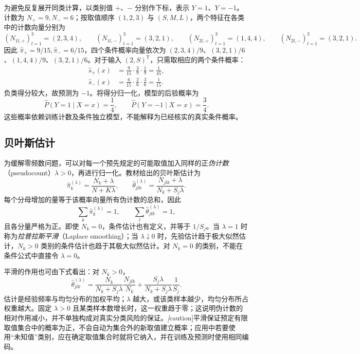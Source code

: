 \begin{solve}
为避免反复展开同类计算，以类别值 $+$、$-$ 分别作下标，表示 $Y=1$、$Y=-1$。计数为 $N_+=9,N_-=6$；按取值顺序 $(1,2,3)$ 与 $(S,M,L)$，两个特征在各类中的计数向量分别为
\[
    (N_{1l,+})_{l=1}^{3}=(2,3,4),\qquad
    (N_{1l,-})_{l=1}^{3}=(3,2,1),\qquad
    (N_{2l,+})_{l=1}^{3}=(1,4,4),\qquad
    (N_{2l,-})_{l=1}^{3}=(3,2,1).
\]
因此 $\widehat\pi_+=9/15,\widehat\pi_-=6/15$，四个条件概率向量依次为 $(2,3,4)/9$、$(3,2,1)/6$、$(1,4,4)/9$、$(3,2,1)/6$。对于输入 $(2,S)^{\mathsf T}$，只需取相应的两个条件概率：
\begin{align*}
    \widehat s_+(x)&=\frac{9}{15}\cdot\frac{3}{9}\cdot\frac{1}{9}=\frac{1}{45},\\
    \widehat s_-(x)&=\frac{6}{15}\cdot\frac{2}{6}\cdot\frac{3}{6}=\frac{1}{15}.
\end{align*}
负类得分较大，故预测为 $-1$。将得分归一化，模型的后验概率为
\[
    \widehat P(Y=1\mid X=x)=\frac14,\qquad
    \widehat P(Y=-1\mid X=x)=\frac34.
\]
这些概率依赖训练计数及条件独立模型，不能解释为已经核实的真实条件概率。
\end{solve}

\subsection{贝叶斯估计}
\label{subsec:lihang-nb-bayesian-estimation}

为缓解零频数问题，可以对每一个预先规定的可能取值加入同样的正\emph{伪计数}（pseudocount）$\lambda>0$，再进行归一化。教材给出的贝叶斯估计为
\begin{equation}
\label{eq:lihang-nb-smoothed-probabilities}
    \widehat\pi_k^{(\lambda)}=\frac{N_k+\lambda}{N+K\lambda},\qquad
    \widehat\theta_{jlk}^{(\lambda)}=\frac{N_{jlk}+\lambda}{N_k+S_j\lambda}.
\end{equation}
每个分母增加的量等于该概率向量所有伪计数的总和，因此
\[
    \sum_k\widehat\pi_k^{(\lambda)}=1,\qquad
    \sum_l\widehat\theta_{jlk}^{(\lambda)}=1,
\]
且各分量严格为正。即使 $N_k=0$，条件估计也有定义，并等于 $1/S_j$。当 $\lambda=1$ 时称为\emph{拉普拉斯平滑}（Laplace smoothing）；当 $\lambda\downarrow0$ 时，先验估计趋于极大似然估计，$N_k>0$ 类别的条件估计也趋于其极大似然估计。对 $N_k=0$ 的类别，不能在条件公式中直接令 $\lambda=0$。

平滑的作用也可由下式看出：对 $N_k>0$，
\begin{equation}
\label{eq:lihang-nb-smoothing-mixture}
    \widehat\theta_{jlk}^{(\lambda)}
    =\frac{N_k}{N_k+S_j\lambda}\frac{N_{jlk}}{N_k}
     +\frac{S_j\lambda}{N_k+S_j\lambda}\frac{1}{S_j}.
\end{equation}
估计是经验频率与均匀分布的加权平均；$\lambda$ 越大，或该类样本越少，均匀分布所占权重越大。固定 $\lambda>0$ 且某类样本数增长时，这一权重趋于零；这说明伪计数的相对作用减小，并不单独构成对真实分类风险的保证。\emph[caution]{平滑保证预定有限取值集合中的概率为正，不会自动为集合外的新取值建立概率}；应用中若要使用“未知值”类别，应在确定取值集合时就将它纳入，并在训练及预测时使用相同编码。

